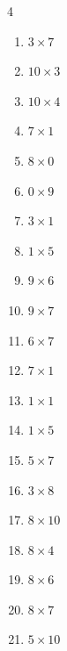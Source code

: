 \begin{multicols}{4}
\begin{enumerate}
\columnbreak %

  \item $3\times 7$
        \phantom{$=21$}

  \item $10\times 3$
        \phantom{$=30$}

  \item $10\times 4$
        \phantom{$=40$}

  \item $7\times 1$
        \phantom{$=7$}

  \item $8\times 0$
        \phantom{$=0$}

  \item $0\times 9$
        \phantom{$=0$}

  \item $3\times 1$
        \phantom{$=3$}

  \item $1\times 5$
        \phantom{$=5$}

  \item $9\times 6$
        \phantom{$=54$}

  \item $9\times 7$
        \phantom{$=63$}

  \item $6\times 7$
        \phantom{$=42$}

  \item $7\times 1$
        \phantom{$=7$}

  \item $1\times 1$
        \phantom{$=1$}

  \item $1\times 5$
        \phantom{$=5$}

  \item $5\times 7$
        \phantom{$=35$}

  \item $3\times 8$
        \phantom{$=24$}

  \item $8\times 10$
        \phantom{$=80$}

  \item $8\times 4$
        \phantom{$=32$}

  \item $8\times 6$
        \phantom{$=48$}

  \item $8\times 7$
        \phantom{$=56$}

  \item $5\times 10$
        \phantom{$=50$}


\end{enumerate}
\end{multicols}
